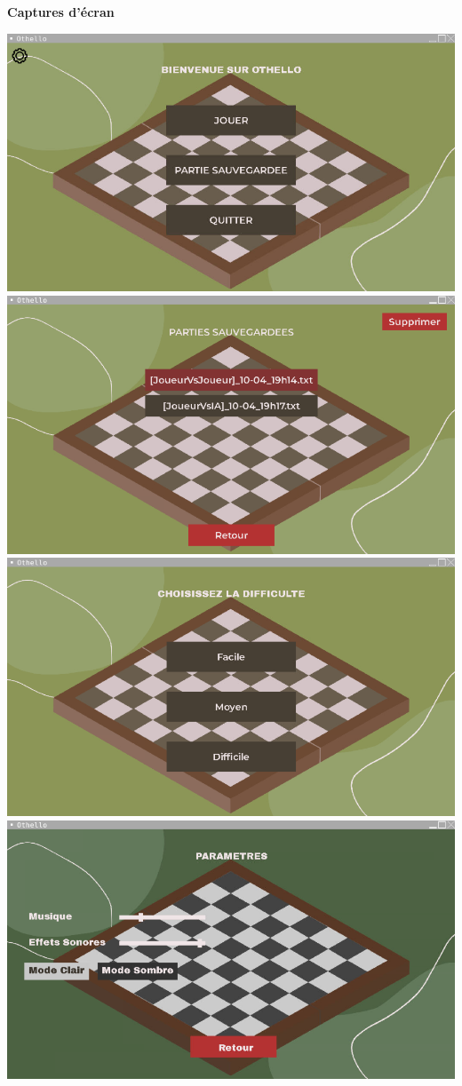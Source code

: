\documentclass[12pt, a4paper, oneside]{article}
\begin{document}
    \textbf{Captures d'écran}
        \begin{center}
            \includegraphics[scale=0.7]{menu_principal.png}
            \includegraphics[scale=0.7]{menu_sauv.png}
            \includegraphics[scale=0.7]{sous_menu.png}
            \includegraphics[scale=0.7]{parametres.png}

\end{center}
\end{document}
